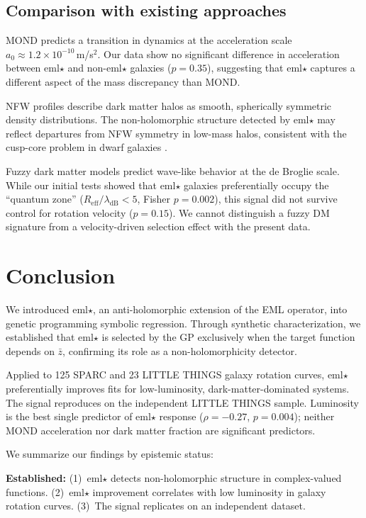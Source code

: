 \documentclass[12pt,a4paper]{article}
\begin{document}
\subsection{Comparison with existing approaches}

MOND \citep{Milgrom1983} predicts a transition in dynamics at the acceleration scale $a_0 \approx 1.2 \times 10^{-10}$\,m/s$^2$. Our data show no significant difference in acceleration between eml$\star$ and non-eml$\star$ galaxies ($p = 0.35$), suggesting that eml$\star$ captures a different aspect of the mass discrepancy than MOND.

NFW profiles \citep{NFW1996} describe dark matter halos as smooth, spherically symmetric density distributions. The non-holomorphic structure detected by eml$\star$ may reflect departures from NFW symmetry in low-mass halos, consistent with the cusp-core problem in dwarf galaxies \citep{deBlok2010}.

Fuzzy dark matter models \citep{Hu2000} predict wave-like behavior at the de Broglie scale. While our initial tests showed that eml$\star$ galaxies preferentially occupy the ``quantum zone'' ($R_\mathrm{eff}/\lambda_\mathrm{dB} < 5$, Fisher $p = 0.002$), this signal did not survive control for rotation velocity ($p = 0.15$). We cannot distinguish a fuzzy DM signature from a velocity-driven selection effect with the present data.

\section{Conclusion}

We introduced eml$\star$, an anti-holomorphic extension of the EML operator, into genetic programming symbolic regression. Through synthetic characterization, we established that eml$\star$ is selected by the GP exclusively when the target function depends on $\bar{z}$, confirming its role as a non-holomorphicity detector.

Applied to 125 SPARC and 23 LITTLE THINGS galaxy rotation curves, eml$\star$ preferentially improves fits for low-luminosity, dark-matter-dominated systems. The signal reproduces on the independent LITTLE THINGS sample. Luminosity is the best single predictor of eml$\star$ response ($\rho = -0.27$, $p = 0.004$); neither MOND acceleration nor dark matter fraction are significant predictors.

We summarize our findings by epistemic status:

\textbf{Established:} (1)~eml$\star$ detects non-holomorphic structure in complex-valued functions. (2)~eml$\star$ improvement correlates with low luminosity in galaxy rotation curves. (3)~The signal replicates on an independent dataset.
\end{document}
